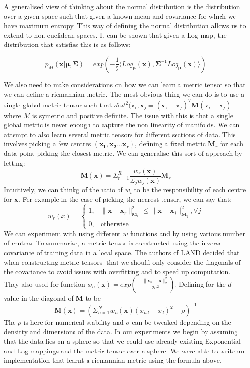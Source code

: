 \documentclass{article}
\begin{document}
A generalised view of thinking about the normal distribution is the distribution over a given space such that given a known mean and covariance for which we have maximum entropy.
This way of defining the normal distribution allows us to extend to non euclidean spaces.
It can be shown that given a Log map, the distribution that satisfies this is as follows:

$$p_M(\bm{x}|\bm{\mu},\bm{\Sigma}) = exp(-\frac{1}{2}\langle Log_{\bm{\mu}}(\bm{x}),
\bm{\Sigma}^{-1}Log_{\bm{\mu}}(\bm{x})\rangle)$$

We also need to make considerations on how we can learn a metric tensor so that we can define a riemannian metric.
The most obvious thing we can do is to use a single global metric tensor such that $dist^2(\bm{x}_i, \bm{x}_j = (\bm{x}_i-\bm{x}_j)^T\bm{M}(\bm{x}_i-\bm{x}_j)$ where $M$ is symetric and positive definite.
The issue with this is that a single global metric is never enough to capture the non linearity of manifolds.
We can attempt to also learn several metric tensors for different sections of data.
This involves picking a few centres $(\bm{x_1}, \bm{x_2} ... \bm{x_r})$, defining a fixed metric $\bm{M}_r$ for each data point picking the closest metric.
We can generalise this sort of approach by letting:
$$\bm{M}(\bm{x}) = \Sigma_{r=1}^R\frac{w_r(\bm{x})}{\Sigma_jw_j(\bm{x})}\bm{M}_r$$
Intuitively, we can thinkg of the ratio of $w_i$ to be the responsibility of each centre for $\bm{x}$.
For example in the case of picking the nearest tensor, we can say that:
$$w_r(x) = \begin{cases} 1,&\|\bm{x}-\bm{x}_r\|_{\bm{M}_r}^2 \leq \|\bm{x}-\bm{x}_j\|_{\bm{M}_j}^2, \forall j \\
0,& \text{otherwise}\end{cases}$$
We can experiment with using different $w$ functions and by using various number of centres.
To summarise, a metric tensor is constructed using the inverse covariance of training data in a local space.
The authors of LAND decided that when constructing metric tensors, that we should only consider the diagonals of the covariance to avoid issues with overfitting and to speed up computation.
They also used for function $w_n(\bm{x}) = exp(-\frac{\|\bm{x}_n-\bm{x}\|_2^2}{2\sigma^2})$.
Defining for the $d$ value in the diagonal of $\bm{M}$ to be $$\bm{M}(\bm{x}) = (\Sigma_{n=1}^Nw_n(\bm{x})(x_{nd}-x_d)^2+\rho)^{-1}$$
The $\rho$ is here for numerical stability and $\sigma$ can be tweaked depending on the densitty and dimensions of the data.
In our experiments we begin by assuming that the data lies on a sphere so that we could use already existing Exponential and Log mappings and the metric tensor over a sphere.
We were able to write an implementation that learnt a riemannian metric using the formula above.
\end{document}

